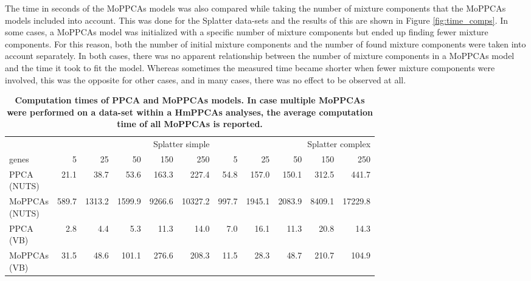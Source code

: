 The time in seconds of the MoPPCAs models was also compared while taking the number of mixture components that the MoPPCAs models included into account. This was done for the Splatter data-sets and the results of this are shown in Figure \ref{fig:time_comps}. In some cases, a MoPPCAs model was initialized with a specific number of mixture components but ended up finding fewer mixture components. For this reason, both the number of initial mixture components and the number of found mixture components were taken into account separately. In both cases, there was no apparent relationship between the number of mixture components in a MoPPCAs model and the time it took to fit the model. Whereas sometimes the measured time became shorter when fewer mixture components were involved, this was the opposite for other cases, and in many cases, there was no effect to be observed at all.


\begin{table}
\setlength{\tabcolsep}{3pt}
    \caption[Computation times of PPCA and MoPPCAs models.]{\textbf{Computation times of PPCA and MoPPCAs models. In case multiple MoPPCAs were performed on a data-set within a HmPPCAs analyses, the average computation time of all MoPPCAs is reported.}}
    \centering
    \small
    \begin{tabular}{l|rrrrr|rrrrr}
          & \multicolumn{5}{r}{Splatter simple} & \multicolumn{5}{r}{Splatter complex}\\
          genes & 5 & 25 & 50 & 150 & 250 & 5 & 25 & 50 & 150 & 250\\
          \hline
        \makecell{PPCA\\(NUTS)} & 21.1 & 38.7 & 53.6 & 163.3 & 227.4 & 54.8 & 157.0 & 150.1 & 312.5 & 441.7\\
        \makecell{MoPPCAs\\(NUTS)} & 589.7 &  1313.2 & 1599.9 & 9266.6 & 10327.2 & 997.7 & 1945.1 & 2083.9 & 8409.1 & 17229.8\\
        \makecell{PPCA\\(VB)} & 2.8 & 4.4 & 5.3 & 11.3 & 14.0 & 7.0 & 16.1 & 11.3 & 20.8 & 14.3\\
        \makecell{MoPPCAs\\(VB)} & 31.5 & 48.6 & 101.1 & 276.6 & 208.3 & 11.5 & 28.3 & 48.7 & 210.7 & 104.9\\
    \end{tabular}
    \label{tab:timetable}
\end{table}

